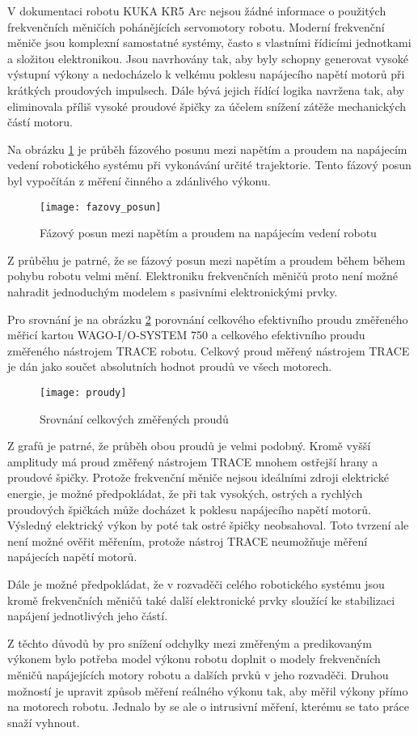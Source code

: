 V dokumentaci robotu KUKA KR5 Arc nejsou žádné informace o použitých frekvenčních měničích pohánějících servomotory robotu. Moderní frekvenční měniče jsou komplexní samostatné systémy, často s vlastními řídicími jednotkami a složitou elektronikou. Jsou navrhovány tak, aby byly schopny generovat vysoké výstupní výkony a nedocházelo k velkému poklesu napájecího napětí motorů při krátkých proudových impulsech. Dále bývá jejich řídící logika navržena tak, aby eliminovala příliš vysoké proudové špičky za účelem snížení zátěže mechanických částí motoru.

Na obrázku \ref{fazovy_posun_pic} je průběh fázového posunu mezi napětím a proudem na napájecím vedení robotického systému při vykonávání určité trajektorie. Tento fázový posun byl vypočítán z měření činného a zdánlivého výkonu. 

\begin{figure}[h!]
\texttt{[image: fazovy\_posun]}
\caption{Fázový posun mezi napětím a proudem na napájecím vedení robotu}
\label{fazovy_posun_pic}
\end{figure}

Z průběhu je patrné, že se fázový posun mezi napětím a proudem během během pohybu robotu velmi mění. Elektroniku frekvenčních měničů proto není možné nahradit jednoduchým modelem s pasivními elektronickými prvky.  

Pro srovnání je na obrázku \ref{proudy_pic} porovnání celkového efektivního proudu změřeného měřicí kartou WAGO-I/O-SYSTEM 750 a celkového efektivního proudu změřeného nástrojem TRACE robotu. Celkový proud měřený nástrojem TRACE je dán jako součet absolutních hodnot proudů ve všech motorech.

\begin{figure}[h!]
\texttt{[image: proudy]}
\caption{Srovnání celkových změřených proudů}
\label{proudy_pic}
\end{figure}

Z grafů je patrné, že průběh obou proudů je velmi podobný. Kromě vyšší amplitudy má proud změřený nástrojem TRACE mnohem ostřejší hrany a proudové špičky. Protože frekvenční měniče nejsou ideálními zdroji elektrické energie, je možné předpokládat, že při tak vysokých, ostrých a rychlých proudových špičkách může docházet k poklesu napájecího napětí motorů. Výsledný elektrický výkon by poté tak ostré špičky neobsahoval. Toto tvrzení ale není možné ověřit měřením, protože nástroj TRACE neumožňuje měření napájecích napětí motorů.

\newpage

Dále je možné předpokládat, že v rozvaděči celého robotického systému jsou kromě frekvenčních měničů také další elektronické prvky sloužící ke stabilizaci napájení jednotlivých jeho částí. 

Z těchto důvodů by pro snížení odchylky mezi změřeným a predikovaným výkonem bylo potřeba model výkonu robotu doplnit o modely frekvenčních měničů napájejících motory robotu a dalších prvků v jeho rozvaděči. Druhou možností je upravit způsob měření reálného výkonu tak, aby měřil výkony přímo na motorech robotu. Jednalo by se ale o intrusivní měření, kterému se tato práce snaží vyhnout.